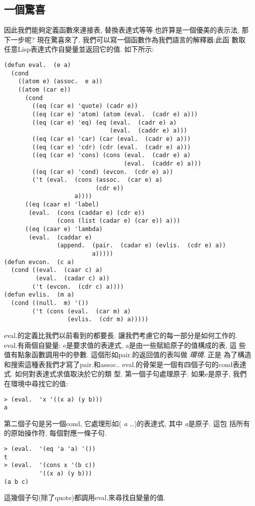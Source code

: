 \documentclass[12pt]{article}
\begin{document}
\begin{CJK}{UTF8}{bsmi}
\section{一個驚喜} 
因此我們能夠定義函數來連接表, 替換表達式等等.也許算是一個優美的表示法, 
那下一步呢? 
現在驚喜來了. 
我們可以寫一個函數作為我們語言的解釋器:此函 
數取任意Lisp表達式作自變量並返回它的值. 
如下所示: 
\begin{verbatim} 
(defun eval.  (e a) 
  (cond 
    ((atom e) (assoc.  e a)) 
    ((atom (car e)) 
      (cond 
        ((eq (car e) 'quote) (cadr e)) 
        ((eq (car e) 'atom) (atom (eval.  (cadr e) a))) 
        ((eq (car e) 'eq) (eq (eval.  (cadr e) a) 
                              (eval.  (caddr e) a))) 
        ((eq (car e) 'car) (car (eval.  (cadr e) a))) 
        ((eq (car e) 'cdr) (cdr (eval.  (cadr e) a))) 
        ((eq (car e) 'cons) (cons (eval.  (cadr e) a) 
                                  (eval.  (caddr e) a))) 
        ((eq (car e) 'cond) (evcon.  (cdr e) a)) 
        ('t (eval.  (cons (assoc.  (car e) a) 
                          (cdr e)) 
                    a)))) 
      ((eq (caar e) 'label) 
       (eval.  (cons (caddar e) (cdr e)) 
               (cons (list (cadar e) (car e)) a))) 
      ((eq (caar e) 'lambda) 
       (eval.  (caddar e) 
               (append.  (pair.  (cadar e) (evlis.  (cdr e) a)) 
                         a))))) 
(defun evcon.  (c a) 
  (cond ((eval.  (caar c) a) 
         (eval.  (cadar c) a)) 
        ('t (evcon.  (cdr c) a)))) 
(defun evlis.  (m a) 
  (cond ((null.  m) '()) 
        ('t (cons (eval.  (car m) a) 
                  (evlis.  (cdr m) a))))) 
\end{verbatim} 
eval.的定義比我們以前看到的都要長. 
讓我們考慮它的每一部分是如何工作的. 
eval.有兩個自變量: 
e是要求值的表達式, 
a是由一些賦給原子的值構成的表, 這 
些值有點象函數調用中的參數. 
這個形如pair.的返回值的表叫做{\em 
環境}. 
正是 
為了構造和搜索這種表我們才寫了pair.和assoc.. 
eval.的骨架是一個有四個子句的cond表達式. 
如何對表達式求值取決於它的類 
型. 
第一個子句處理原子. 
如果e是原子, 
我們在環境中尋找它的值: 
\begin{verbatim} 
> (eval.  'x '((x a) (y b))) 
a 
\end{verbatim} 
第二個子句是另一個cond, 
它處理形如({\it 
a} 
\dots)的表達式, 
其中{\it 
a}是原子. 
這包 
括所有的原始操作符, 
每個對應一條子句. 
\begin{verbatim} 
> (eval.  '(eq 'a 'a) '()) 
t 
> (eval.  '(cons x '(b c)) 
          '((x a) (y b))) 
(a b c) 
\end{verbatim} 
這幾個子句(除了quote)都調用eval.來尋找自變量的值. 

\end{CJK}
\end{document}
